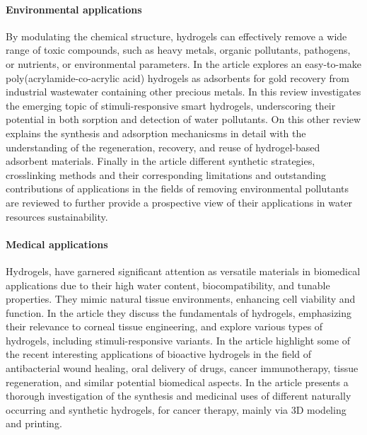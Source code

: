 \paragraph{Environmental applications} By modulating the chemical structure, hydrogels can effectively remove a wide range of toxic compounds, such as heavy metals, organic pollutants, pathogens, or nutrients, or environmental parameters.
In the article\citep{cinfrigniniGoldRushDesigning2024} explores an easy-to-make poly(acrylamide-co-acrylic acid) hydrogels as adsorbents for gold recovery from industrial wastewater containing other precious metals.
In this review\citep{randoFunctionalBioBasedPolymeric2024} investigates the emerging topic of stimuli-responsive smart hydrogels, underscoring their potential in both sorption and detection of water pollutants.
On this other review\citep{darbanHydrogelBasedAdsorbentMaterial2022a} explains the synthesis and adsorption mechanicsms in detail with the understanding of the regeneration, recovery, and reuse of hydrogel-based adsorbent materials.
Finally in the article\citep{songSynthesisHydrogelsTheir2022} different synthetic strategies, crosslinking methods and their corresponding limitations and outstanding contributions of applications in the fields of removing environmental pollutants are reviewed to further provide a prospective view of their applications in water resources sustainability.


\paragraph{Medical applications} Hydrogels, have garnered significant attention as versatile materials in biomedical applications due to their high water content, biocompatibility, and tunable properties. 
They mimic natural tissue environments, enhancing cell viability and function.
In the article\citep{wuAdvancementsHydrogelsCorneal2024} they discuss the fundamentals of hydrogels, emphasizing their relevance to corneal tissue engineering, and explore various types of hydrogels, including stimuli-responsive variants.
In the article\citep{kaurHydrogelsPotentialBiomaterial2024} highlight some of the recent interesting applications of bioactive hydrogels in the field of antibacterial wound healing, oral delivery of drugs, cancer immunotherapy, tissue regeneration, and similar potential biomedical aspects.
In the article\citep{thummaIntroductionClassificationApplications2025} presents a thorough investigation of the synthesis and medicinal uses of different naturally occurring and synthetic hydrogels, for cancer therapy, mainly via 3D modeling and printing.

